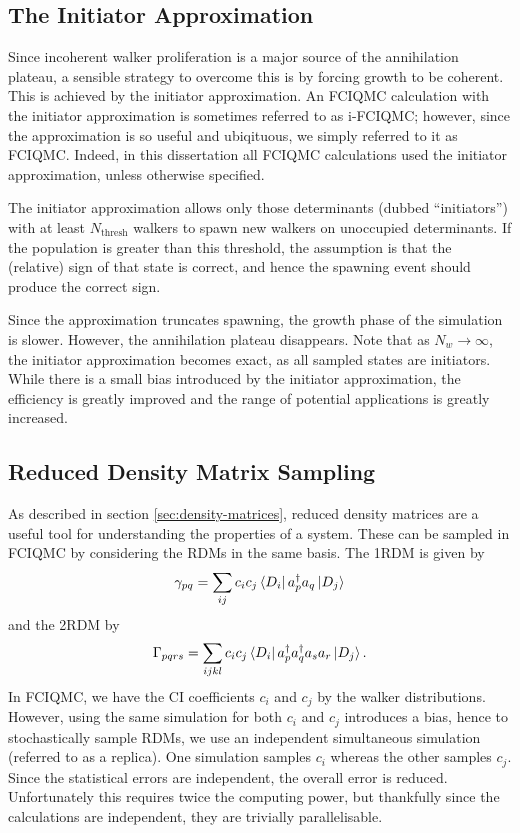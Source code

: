 \subsection{The Initiator Approximation}

Since incoherent walker proliferation is a major source of the annihilation plateau, a sensible strategy to overcome this is by forcing growth to be coherent. This is achieved by the initiator approximation.\supercite{clelandCommunications2010} An \gls{FCIQMC} calculation with the initiator approximation is sometimes referred to as i-FCIQMC; however, since the approximation is so useful and ubiqituous, we simply referred to it as FCIQMC. Indeed, in this dissertation all FCIQMC calculations used the initiator approximation, unless otherwise specified.

The initiator approximation allows only those determinants (dubbed ``initiators'') with at least $N_\mathrm{thresh}$ walkers to spawn new walkers on unoccupied determinants. If the population is greater than this threshold, the assumption is that the (relative) sign of that state is correct, and hence the spawning event should produce the correct sign.

Since the approximation truncates spawning, the growth phase of the simulation is slower. However, the annihilation plateau disappears. Note that as $N_w\to\infty$, the initiator approximation becomes exact, as all sampled states are initiators. While there is a small bias introduced by the initiator approximation, the efficiency is greatly improved and the range of potential applications is greatly increased.

\subsection{Reduced Density Matrix Sampling}
\label{sec:fciqmc_rdm}
As described in section \ref{sec:density-matrices}, reduced density matrices are a useful tool for understanding the properties of a system. These can be sampled in \gls{FCIQMC} by considering the RDMs in the same basis.\supercite{overyUnbiased2014} The \gls{1RDM} is given by
\begin{equation}
    \gamma_{pq} = \sum_{ij} c_ic_j \bra{D_i}a_p^\dag a_q\ket{D_j}
\end{equation}
and the \gls{2RDM} by
\begin{equation}
    \Gamma_{pqrs} = \sum_{ijkl} c_ic_j \bra{D_i}a_p^\dag a_q^\dag a_s a_r\ket{D_j}.
\end{equation}
In FCIQMC, we have the \gls{CI} coefficients $c_i$ and $c_j$ by the walker distributions. However, using the same simulation for both $c_i$ and $c_j$ introduces a bias, hence to stochastically sample RDMs, we use an independent simultaneous simulation (referred to as a replica). One simulation samples $c_i$ whereas the other samples $c_j$. Since the statistical errors are independent, the overall error is reduced. Unfortunately this requires twice the computing power, but thankfully since the calculations are independent, they are trivially parallelisable.

